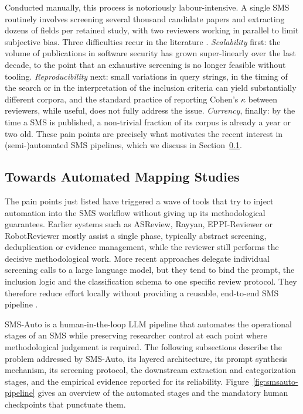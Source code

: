 Conducted manually, this process is notoriously labour-intensive. A
single SMS routinely involves screening several thousand candidate
papers and extracting dozens of fields per retained study, with two
reviewers working in parallel to limit subjective bias. Three
difficulties recur in the literature \citep{placeholder-sms-pain} .
\emph{Scalability} first: the volume of publications in software
security has grown super-linearly over the last decade, to the point
that an exhaustive screening is no longer feasible without tooling.
\emph{Reproducibility} next: small variations in query strings, in the
timing of the search or in the interpretation of the inclusion criteria
can yield substantially different corpora, and the standard practice of
reporting Cohen's $\kappa$ between reviewers, while useful, does not
fully address the issue. \emph{Currency}, finally: by the time a SMS is
published, a non-trivial fraction of its corpus is already a year or
two old. These pain points are precisely what motivates the recent
interest in (semi-)automated SMS pipelines, which we discuss in
Section~\ref{subsubsec:sms-auto}.

\subsection{Towards Automated Mapping Studies}
\label{subsubsec:sms-auto}

The pain points just listed have triggered a wave of tools that try to
inject automation into the SMS workflow without giving up its
methodological guarantees. Earlier systems such as ASReview, Rayyan,
EPPI-Reviewer or RobotReviewer mostly assist a single phase, typically
abstract screening, deduplication or evidence management, while the
reviewer still performs the decisive methodological work. More recent
approaches delegate individual screening calls to a large language
model, but they tend to bind the prompt, the inclusion logic and the
classification schema to one specific review protocol. They therefore
reduce effort locally without providing a reusable, end-to-end SMS
pipeline \cite{placeholder-sms-auto}.

SMS-Auto is a human-in-the-loop LLM pipeline that
automates the operational stages of an SMS while preserving researcher
control at each point where methodological judgement is required. The
following subsections describe the problem addressed by SMS-Auto, its
layered architecture, its prompt synthesis mechanism, its screening
protocol, the downstream extraction and categorization stages, and the
empirical evidence reported for its reliability. Figure~\ref{fig:smsauto-pipeline}
gives an overview of the automated stages and the mandatory human
checkpoints that punctuate them.

